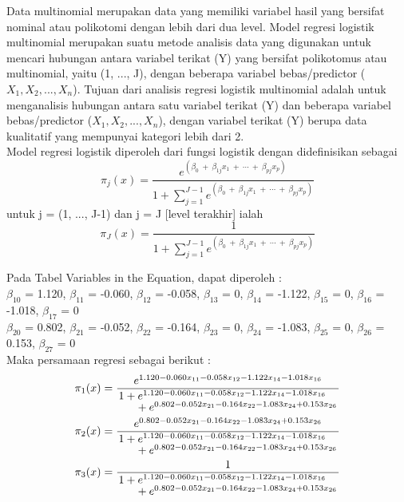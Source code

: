 \begin{sloppypar}
Data multinomial merupakan data yang memiliki variabel hasil yang bersifat nominal atau polikotomi dengan lebih dari dua level. Model regresi logistik multinomial merupakan suatu metode analisis data yang digunakan untuk mencari hubungan antara variabel terikat (Y) yang bersifat polikotomus atau multinomial, yaitu (1, ..., J), dengan beberapa variabel bebas/predictor ($X_1, X_2, ..., X_n$). 
Tujuan dari analisis regresi logistik multinomial adalah untuk menganalisis hubungan antara satu variabel terikat (Y) dan beberapa variabel bebas/predictor ($X_1, X_2, ..., X_n$), dengan variabel terikat (Y) berupa data kualitatif yang mempunyai kategori lebih dari 2.
\\ Model regresi logistik diperoleh dari fungsi logistik dengan didefinisikan sebagai
\begin{equation}
\pi_j(x) = \frac{e^{(\beta_0\ +\ \beta_{1j} x_1\ +\ \cdots\ +\ \beta_{pj} x_p)}}{1 + \sum_{j=1}^{J-1} e^{(\beta_0\ +\ \beta_{1j} x_1\ +\ \cdots\ +\ \beta_{pj} x_p)}}
\end{equation}
untuk j = (1, ..., J-1) dan j = J [level terakhir] ialah
\begin{equation}
\pi_J(x) = \frac{1}{1 + \sum_{j=1}^{J-1} e^{(\beta_0\ +\ \beta_{1j} x_1\ +\ \cdots\ +\ \beta_{pj} x_p)}}
\end{equation}
\end{sloppypar}
\begin{test}{
    Pada Tabel Variables in the Equation, dapat diperoleh : \\
    $\beta_{10}$ = 1.120, $\beta_{11}$ = -0.060, $\beta_{12}$ = -0.058, $\beta_{13}$ = 0, $\beta_{14}$ = -1.122, $\beta_{15}$ = 0, $\beta_{16}$ = -1.018, $\beta_{17}$ = 0 \\
    $\beta_{20}$ = 0.802, $\beta_{21}$ = -0.052, $\beta_{22}$ = -0.164, $\beta_{23}$ = 0, $\beta_{24}$ = -1.083, $\beta_{25}$ = 0, $\beta_{26}$ = 0.153, $\beta_{27}$ = 0 \\
    Maka persamaan regresi sebagai berikut : \\
    \begin{equation*}
    \begin{aligned}
        \pi_1(x) &= \frac{e^{1.120 - 0.060 x_{11} - 0.058 x_{12} - 1.122 x_{14} - 1.018 x_{16}}}{\splitfrac{1 + e^{1.120 - 0.060 x_{11} - 0.058 x_{12} - 1.122 x_{14} - 1.018 x_{16}}}{+ e^{0.802 - 0.052 x_{21} - 0.164 x_{22} - 1.083 x_{24} + 0.153 x_{26}}}} \\
        \pi_2(x) &= \frac{e^{0.802 - 0.052 x_{21} - 0.164 x_{22} - 1.083 x_{24} + 0.153 x_{26}}}{\splitfrac{1 + e^{1.120 - 0.060 x_{11} - 0.058 x_{12} - 1.122 x_{14} - 1.018 x_{16}}}{+ e^{0.802 - 0.052 x_{21} - 0.164 x_{22} - 1.083 x_{24} + 0.153 x_{26}}}} \\
        \pi_3(x) &= \frac{1}{\splitfrac{1 + e^{1.120 - 0.060 x_{11} - 0.058 x_{12} - 1.122 x_{14} - 1.018 x_{16}}}{+ e^{0.802 - 0.052 x_{21} - 0.164 x_{22} - 1.083 x_{24} + 0.153 x_{26}}}}
    \end{aligned}
    \end{equation*}
}
\end{test}

